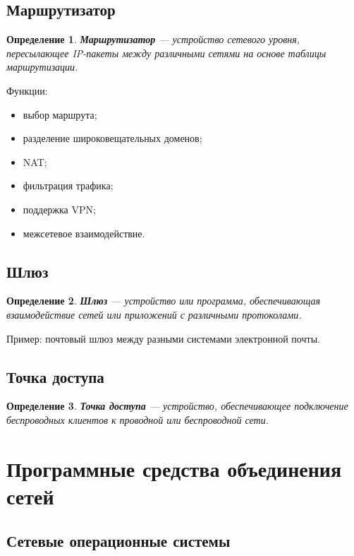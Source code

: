 \documentclass[12pt,a4paper]{article}
\newtheorem{definition}{Определение}
\begin{document}
\subsection{Маршрутизатор}

\begin{definition}
\textbf{Маршрутизатор} --- устройство сетевого уровня, пересылающее IP-пакеты между различными сетями на основе таблицы маршрутизации.
\end{definition}

Функции:
\begin{itemize}
    \item выбор маршрута;
    \item разделение широковещательных доменов;
    \item NAT;
    \item фильтрация трафика;
    \item поддержка VPN;
    \item межсетевое взаимодействие.
\end{itemize}

\subsection{Шлюз}

\begin{definition}
\textbf{Шлюз} --- устройство или программа, обеспечивающая взаимодействие сетей или приложений с различными протоколами.
\end{definition}

Пример: почтовый шлюз между разными системами электронной почты.

\subsection{Точка доступа}

\begin{definition}
\textbf{Точка доступа} --- устройство, обеспечивающее подключение беспроводных клиентов к проводной или беспроводной сети.
\end{definition}

\section{Программные средства объединения сетей}

\subsection{Сетевые операционные системы}
\end{document}
